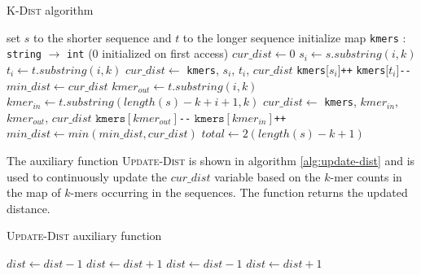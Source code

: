 \begin{algorithm}[H]
  \caption{\textsc{K-Dist} algorithm}
  \label{alg:K-Dist}
  \begin{algorithmic}[1]
    \Statex
      \State set $s$ to the shorter sequence and $t$ to the longer sequence
      \State initialize map \texttt{kmers} : \texttt{string} $\to$
        \texttt{int} (0 initialized on first access)
      \State $cur\_dist \gets 0$
        \State $s_i \gets s.substring(i, k)$
        \State $t_i \gets t.substring(i, k)$
        \State $cur\_dist \gets $ 
          {\texttt{kmers}, $s_i$, $t_i$, $cur\_dist$}
        \State \texttt{kmers}[$s_i$]\texttt{++}
        \State \texttt{kmers}[$t_i$]\texttt{-{}-}
      \EndFor
      \State $min\_dist \gets cur\_dist$
        \State $kmer_{out} \gets t.substring(i, k)$
        \State $kmer_{in} \gets t.substring(length(s)-k+i+1, k)$
        \State $cur\_dist \gets $ 
          {\texttt{kmers}, $kmer_{in}$, $kmer_{out}$, $cur\_dist$}
        \State $\mathtt{kmers}[kmer_{out}]$\texttt{-{}-}
        \State $\mathtt{kmers}[kmer_{in}]$\texttt{++}
        \State $min\_dist \gets min(min\_dist, cur\_dist)$
      \EndFor
          \State $total \gets 2(length(s)-k+1)$
      \State {}
    \EndFunction
  \end{algorithmic}
\end{algorithm}

The auxiliary function \textsc{Update-Dist} is shown in algorithm
\ref{alg:update-dist} and is used to continuously update the $cur\_dist$
variable based on the $k$-mer counts in the map of $k$-mers occurring in the
sequences. The function returns the updated distance.

\begin{algorithm}[H]
  \caption{\textsc{Update-Dist} auxiliary function}
  \label{alg:update-dist}
  \begin{algorithmic}[1]
    \Statex
        \State $dist \gets dist - 1$
      \Else
        \State $dist \gets dist + 1$
      \EndIf
        \State $dist \gets dist - 1$
      \Else
        \State $dist \gets dist + 1$
      \EndIf
      \State {}
    \EndFunction
  \end{algorithmic}
\end{algorithm}


